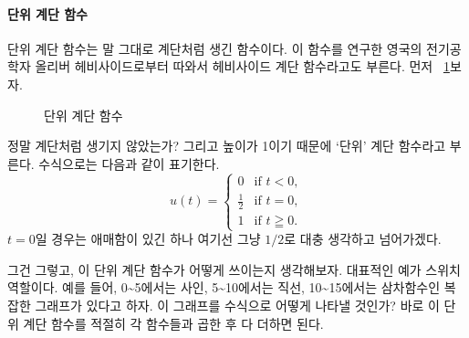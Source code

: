 \paragraph{단위 계단 함수} 단위 계단 함수는 말 그대로 계단처럼 생긴 함수이다. 이 함수를 연구한 영국의 전기공학자 올리버 헤비사이드로부터 따와서 헤비사이드 계단 함수라고도 부른다. 
먼저 \figurename~\ref{fig:usf}\을 보자.
\begin{figure}
    \centering
    \caption{단위 계단 함수}\label{fig:usf}
\end{figure}
정말 계단처럼 생기지 않았는가? 그리고 높이가 1이기 때문에 `단위' 계단 함수라고 부른다. 수식으로는 다음과 같이 표기한다.
\begin{equation}
    u(t)=\begin{cases}
        0 & \text{if } t < 0,\\
        \frac{1}{2} & \text{if } t=0,\\
        1 & \text{if } t \geqq  0.
    \end{cases}
\end{equation}
$t=0$일 경우는 애매함이 있긴 하나 여기선 그냥 $1/2$로 대충 생각하고 넘어가겠다.
\par
그건 그렇고, 이 단위 계단 함수가 어떻게 쓰이는지 생각해보자. 대표적인 예가 스위치 역할이다. 
예를 들어, 0\~{}5에서는 사인, 5\~{}10에서는 직선, 10\~{}15에서는 삼차함수인 복잡한 그래프가 있다고 하자.
이 그래프를 수식으로 어떻게 나타낼 것인가? 바로 이 단위 계단 함수를 적절히 각 함수들과 곱한 후 다 더하면 된다.

